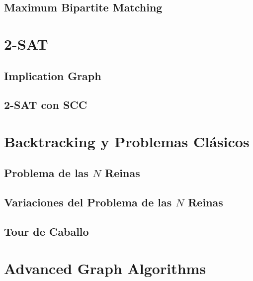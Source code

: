 \documentclass[10pt,a4paper,twocolumn]{article}
\begin{document}
\subsection{Maximum Bipartite Matching}



\section{2-SAT}

\subsection{Implication Graph}

\subsection{2-SAT con SCC}



\section{Backtracking y Problemas Clásicos}

\subsection{Problema de las $N$ Reinas}

\subsection{Variaciones del Problema de las $N$ Reinas}

\subsection{Tour de Caballo}



\section{Advanced Graph Algorithms}
\end{document}
